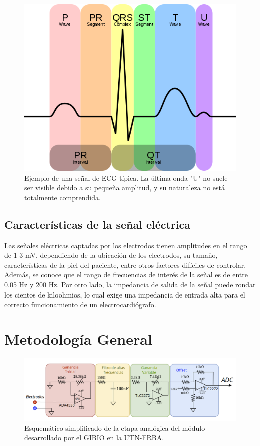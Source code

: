 \documentclass[conference]{IEEEtran}
\begin{document}
\begin{figure}[th]
    \centerline{\includegraphics[width=0.9\linewidth]{figs/512px-EKG_Complex_en.svg.png}}
    \caption{Ejemplo de una señal de ECG típica. La última onda "U" no suele ser
    visible debido a su pequeña amplitud, y su naturaleza no está totalmente
    comprendida.}
    \label{fig:ecg_onda}
\end{figure}



\subsection{Características de la señal eléctrica} \label{electrical_characteristics}

Las señales eléctricas captadas por los electrodos tienen amplitudes en el rango de
1-3 mV, dependiendo de la ubicación de los electrodos, su tamaño, características
de la piel del paciente, entre otros factores difíciles de controlar. Además, se
conoce que el rango de frecuencias de interés de la señal es de entre
0.05 Hz y 200 Hz. Por otro lado, la impedancia de salida de la señal puede rondar
los cientos de kiloohmios, lo cual exige una impedancia de entrada alta para el
correcto funcionamiento de un electrocardiógrafo.  
 \cite{ecg_signal_amp} \cite{ecg_signal_freq}


\section{Metodología General}

\begin{figure}[hb]
    \centering
    \includegraphics[width=\textwidth]{figs/etapa_analogica.png}
    \caption{Esquemático simplificado de la etapa analógica del módulo desarrollado 
    por el GIBIO en la UTN-FRBA.}
    \label{fig:etapa_analogica_esquematico}
\end{figure}
\end{document}
